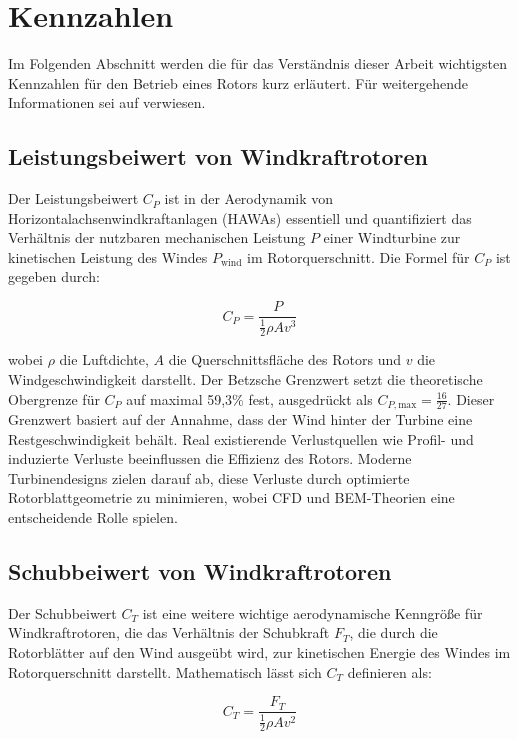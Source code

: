 \section{Kennzahlen}
Im Folgenden Abschnitt werden die für das Verständnis dieser Arbeit wichtigsten Kennzahlen für den Betrieb eines Rotors kurz erläutert. Für weitergehende Informationen sei auf \textcite{hau_physikalische_2016} verwiesen.
\subsection{Leistungsbeiwert von Windkraftrotoren}
Der Leistungsbeiwert \( C_P \) ist in der Aerodynamik von Horizontalachsenwindkraftanlagen (HAWAs) essentiell und quantifiziert das Verhältnis der nutzbaren mechanischen Leistung \( P \) einer Windturbine zur kinetischen Leistung des Windes \( P_{\text{wind}} \) im Rotorquerschnitt. Die Formel für \( C_P \) ist gegeben durch:

\begin{equation}
C_P = \frac{P}{\frac{1}{2} \rho A v^3}
\end{equation}

wobei \( \rho \) die Luftdichte, \( A \) die Querschnittsfläche des Rotors und \( v \) die Windgeschwindigkeit darstellt. Der Betzsche Grenzwert setzt die theoretische Obergrenze für \( C_P \) auf maximal 59,3\% fest, ausgedrückt als \( C_{P, \text{max}} = \frac{16}{27} \). Dieser Grenzwert basiert auf der Annahme, dass der Wind hinter der Turbine eine Restgeschwindigkeit behält. Real existierende Verlustquellen wie Profil- und induzierte Verluste beeinflussen die Effizienz des Rotors. Moderne Turbinendesigns zielen darauf ab, diese Verluste durch optimierte Rotorblattgeometrie zu minimieren, wobei CFD und BEM-Theorien eine entscheidende Rolle spielen.

\subsection{Schubbeiwert von Windkraftrotoren}
Der Schubbeiwert \( C_T \) ist eine weitere wichtige aerodynamische Kenngröße für Windkraftrotoren, die das Verhältnis der Schubkraft \( F_T \), die durch die Rotorblätter auf den Wind ausgeübt wird, zur kinetischen Energie des Windes im Rotorquerschnitt darstellt. Mathematisch lässt sich \( C_T \) definieren als:

\begin{equation}
C_T = \frac{F_T}{\frac{1}{2} \rho A v^2}
\end{equation}

